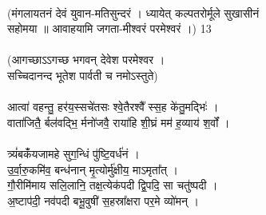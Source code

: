 \\
(मंगलायतनं देवं युवान-मतिसुन्दरं । ध्यायेत् कल्पतरोर्मूले सुखासीनं\\
सहोमया ॥ आवाहयामि जगता-मीश्वरं परमेश्वरं ।) 13\\
\\
(आगच्छाऽऽगच्छ भगवन् देवेश परमेश्वर ।\\
सच्चिदानन्द भूतेश पार्वती च नमोऽस्तुते)\\
\\
आत्वा॑ वहन्तु॒ हर॑य॒स्सचे॑तसः श्वे॒तैरश्वै᳚ स्स॒ह के॑तु॒मद्भिः॑ ।\\
वाता॑जितै॒ र्बल॑वद्भि॒ र्मनो॑जवै॒ राया॑हि शी॒घ्रं मम॑ ह॒व्याय॑ श॒र्वों ।\\
\\
त्र्यं॑बकंँयजामहे सुग॒न्धिं पु॑ष्टि॒वर्ध॑नं ।\\
उ॒र्वा॒रु॒कमि॑व॒ बन्ध॑नान् मृ॒त्योर्मु॑क्षीय॒ माऽमृता᳚त् ।\\
गौ॒रीमि॑माय सलि॒लानि॒ तक्ष॒त्येक॑पदी द्वि॒पदि॒ सा चतु॑ष्पदी ।\\
अ॒ष्टाप॑दी॒ नव॑पदी बभू॒वुषी॑ स॒हस्रा᳚क्षरा पर॒मे व्यो॑मन् ।\\
